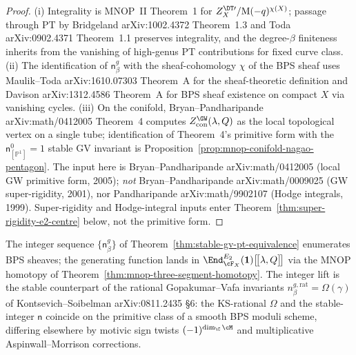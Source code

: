 \begin{proof}
(i) Integrality is MNOP~II Theorem~1 for $Z^{\DT\prime}_X /
\mathrm{M}(-q)^{\chi(X)}$; passage through PT by Bridgeland
\textup{arXiv:1002.4372} Theorem~1.3 and Toda
\textup{arXiv:0902.4371} Theorem~1.1 preserves integrality, and the
degree-$\beta$ finiteness inherits from the vanishing of high-genus
PT contributions for fixed curve class. (ii) The identification of
$\mathsf{n}^{g}_\beta$ with the sheaf-cohomology $\chi$ of the BPS
sheaf uses Maulik--Toda \textup{arXiv:1610.07303} Theorem~A for the
sheaf-theoretic definition and Davison \textup{arXiv:1312.4586}
Theorem~A for BPS sheaf existence on compact $X$ via vanishing
cycles. (iii) On the conifold, Bryan--Pandharipande
\textup{arXiv:math/0412005} Theorem~4 computes
$Z^{\GW}_{\mathrm{con}}(\lambda, Q)$ as the local topological vertex
on a single tube; identification of Theorem~4's primitive form with
the $\mathsf{n}^{0}_{[\mathbb{P}^1]} = 1$ stable GV invariant is
Proposition~\ref{prop:mnop-conifold-nagao-pentagon}. The input here is
Bryan--Pandharipande \textup{arXiv:math/0412005}
(local GW primitive form, 2005); \emph{not} Bryan--Pandharipande
\textup{arXiv:math/0009025} (GW super-rigidity, 2001), nor
Pandharipande \textup{arXiv:math/9902107} (Hodge integrals, 1999).
Super-rigidity and Hodge-integral inputs enter
Theorem~\ref{thm:super-rigidity-e2-centre} below, not the primitive
form.
\end{proof}

\begin{remark}
\label{rem:stable-gv-e2-centre}
The integer sequence $\{\mathsf{n}^{g}_\beta\}$ of
Theorem~\ref{thm:stable-gv-pt-equivalence} enumerates BPS sheaves;
the generating function lands in
$\End^{E_2}_{\cF_X}(\mathbf{1})\bigl[\!\bigl[\lambda, Q\bigr]\!\bigr]$
via the MNOP homotopy of
Theorem~\ref{thm:mnop-three-segment-homotopy}. The integer lift is
the stable counterpart of the rational Gopakumar--Vafa invariants
$n^{g,\mathrm{rat}}_\beta = \Omega(\gamma)$ of Kontsevich--Soibelman
\textup{arXiv:0811.2435} \S6: the KS-rational $\Omega$ and the
stable-integer $\mathsf{n}$ coincide on the primitive class of a
smooth BPS moduli scheme, differing elsewhere by motivic sign twists
$(-1)^{\dim_{\C} \cM}$ and multiplicative Aspinwall--Morrison
corrections.
\end{remark}

